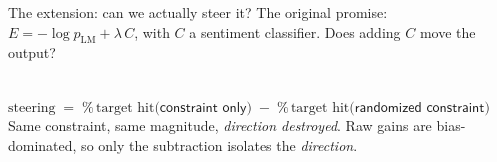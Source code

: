 \documentclass{beamer}
\begin{document}
\begin{frame}{The extension: can we actually steer it?}
  \vspace{0.1em}
  {\footnotesize The original promise: $E = -\log p_{\text{LM}} + \lambda\,C$, with $C$ a sentiment
  classifier. Does adding $C$ move the output?}
  \vspace{0.3em}

  \begin{center}
  \colorbox{imsamber!18}{\parbox{0.95\textwidth}{\centering\scriptsize
    \\[0.1em]
    $\text{steering} \;=\; \%\,\text{target hit}\big(\textsf{constraint only}\big)
     \;-\; \%\,\text{target hit}\big(\textsf{randomized constraint}\big)$\\[0.1em]
    Same constraint, same magnitude, \emph{direction destroyed}. Raw gains are bias-dominated,
    so only the subtraction isolates the \emph{direction}.}}
  \end{center}
  \vspace{0.2em}


\end{frame}
\end{document}
